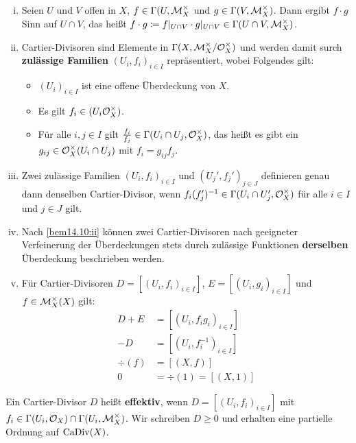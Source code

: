 \begin{bem}
\label{bem:14.10}
	\begin{enumerate}[i)]
		\item\label{bem14.10:i} Seien $U$ und $V$ offen in $X$, $f \in \Gamma(U,\mathcal{M}_X^\times$ und $g \in \Gamma(V, \mathcal{M}_X^\times)$. Dann ergibt $f \cdot g$ Sinn auf $U \cap V$, das heißt $f \cdot g\coloneqq f\vert_{U\cap V} \cdot g \vert_{U \cap V} \in \Gamma(U\cap V, \mathcal{M}_X^\times)$.
		\item\label{bem14.10:ii} Cartier-Divisoren sind Elemente in $\Gamma(X,\mathcal{M}_X^\times/\mathcal{O}_X^\times)$ und werden damit surch \textbf{zulässige Familien} $(U_i,f_i)_{i\in I}$ repräsentiert, wobei Folgendes gilt:
		\begin{itemize}
			\item $(U_i)_{i\in I}$ ist eine offene Überdeckung von $X$.
			\item Es gilt $f_i \in (U_i \mathcal{O}_X^\times)$.
			\item Für alle $i,j \in I$ gilt $\frac{f_i}{f_j}\in \Gamma(U_i\cap U_j,\mathcal{O}_X^\times)$, das heißt es gibt ein $g_{ij} \in \mathcal{O}_X^\times(U_i \cap U_j)$ mit $f_i = g_{ij} f_j$.
		\end{itemize}
		\item\label{bem14.10:iii} Zwei zulässige Familien $(U_i,f_i)_{i \in I}$ und $(U_j',f_j')_{j\in J}$ definieren genau dann denselben Cartier-Divisor, wenn $f_i(f_j')^{-1} \in \Gamma(U_i\cap U_j',\mathcal{O}_X^\times)$ für alle $i\in I$ und $j \in J$ gilt.
		\item\label{bem14.10:iv} Nach \ref{bem14.10:ii} können zwei Cartier-Divisoren nach geeigneter Verfeinerung der Überdeckungen stets durch zulässige Funktionen \textbf{derselben} Überdeckung beschrieben werden.
		\item\label{bem14.10:v} Für Cartier-Divisoren $D = [(U_i,f_i)_{i\in I}]$, $E = [(U_i,g_i)_{i \in I}]$ und $f \in \mathcal{M}_X^\times(X)$ gilt:
		\begin{align*}
			D+E &= [(U_i,f_ig_i)_{i \in I}]\\
			-D &= [(U_i,f_i^{-1})_{i \in I}]\\
			\div(f) &= [(X,f)]\\
			0 &= \div(1) = [(X,1)]
		\end{align*}
	\end{enumerate}
\end{bem}

\begin{defn}
\label{defn:14.11}
	Ein Cartier-Divisor $D$ heißt \textbf{effektiv}, wenn $D = [(U_i,f_i)_{i \in I}]$ mit $f_i \in \Gamma(U_i,\mathcal{O}_X)\cap \Gamma(U_i,\mathcal{M}_X^\times)$. Wir schreiben $D \ge 0$ und erhalten eine partielle Ordnung auf $\operatorname{CaDiv}(X)$.
\end{defn}

